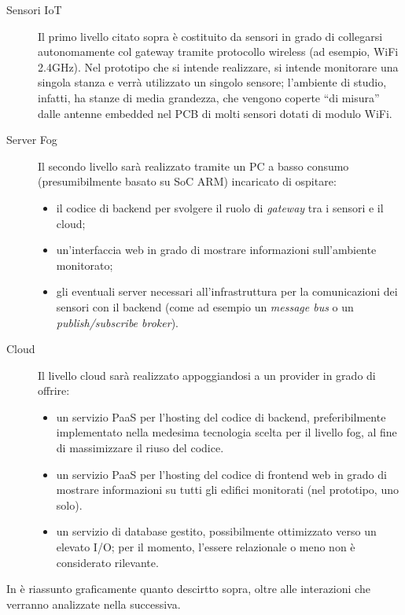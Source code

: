 \begin{description}
  \item[Sensori IoT]
    Il primo livello citato sopra è costituito da sensori in grado di collegarsi autonomamente col gateway tramite protocollo wireless (ad esempio, WiFi 2.4GHz).
    Nel prototipo che si intende realizzare, si intende monitorare una singola stanza e verrà utilizzato un singolo sensore;
    l'ambiente di studio, infatti, ha stanze di media grandezza, che vengono coperte ``di misura'' dalle antenne embedded nel PCB di molti sensori dotati di modulo WiFi.
  \item[Server Fog] %
    Il secondo livello sarà realizzato tramite un PC a basso consumo (presumibilmente basato su SoC ARM) incaricato di ospitare:
    \begin{itemize}
      \item il codice di backend per svolgere il ruolo di \emph{gateway} tra i sensori e il cloud;
      \item un'interfaccia web in grado di mostrare informazioni sull'ambiente monitorato;
      \item gli eventuali server necessari all'infrastruttura per la comunicazioni dei sensori con il backend (come ad esempio un \emph{message bus} o un \emph{publish/subscribe broker}).
    \end{itemize}
  \item[Cloud]
    Il livello cloud sarà realizzato appoggiandosi a un provider in grado di offrire:
    \begin{itemize}
      \item
        un servizio PaaS per l'hosting del codice di backend,
        preferibilmente implementato nella medesima tecnologia scelta per il livello fog, al fine di massimizzare il riuso del codice.
      \item
        un servizio PaaS per l'hosting del codice di frontend web in grado di mostrare informazioni su tutti gli edifici monitorati (nel prototipo, uno solo).
      \item
        un servizio di database gestito, possibilmente ottimizzato verso un elevato I/O\@;
        per il momento, l'essere relazionale o meno non è considerato rilevante.
    \end{itemize}
\end{description}

In  è riassunto graficamente quanto descirtto sopra, oltre alle interazioni che verranno analizzate nella  successiva.

